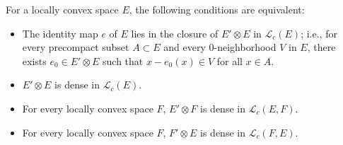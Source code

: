 For a locally convex space $E$, the following conditions are equivalent:

\begin{itemize}
\item[(a)] The identity map $e$ of $E$ lies in the closure of $E' \otimes E$ in $\mathcal{L}_c(E)$; i.e., for every precompact subset $A \subset E$ and every $0$-neighborhood $V$ in $E$, there exists $e_0 \in E' \otimes E$ such that $x - e_0(x) \in V$ for all $x \in A$.
\item[(b)] $E' \otimes E$ is dense in $\mathcal{L}_c(E)$.
\item[(c)] For every locally convex space $F$, $E' \otimes F$ is dense in $\mathcal{L}_c(E, F)$.
\item[(d)] For every locally convex space $F$, $F' \otimes E$ is dense in $\mathcal{L}_c(F, E)$.
\end{itemize}

